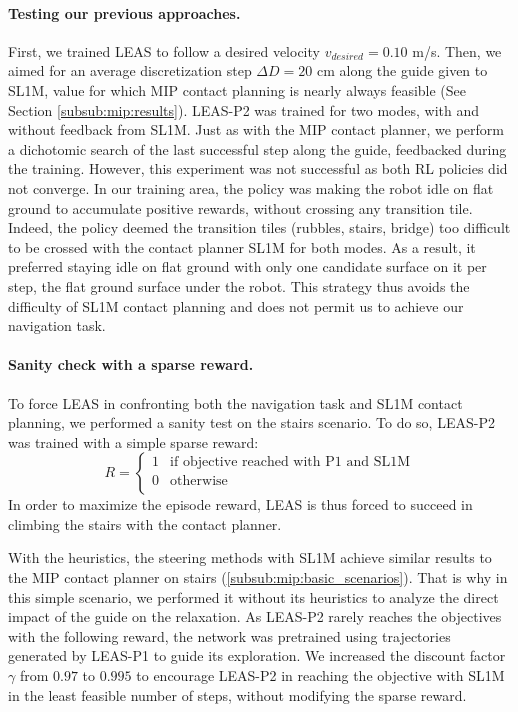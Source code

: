 \paragraph{Testing our previous approaches.}
First, we trained LEAS to follow a desired velocity $v_{desired}=0.10$ m/s. 
Then, we aimed for an average discretization step $\Delta D=20$ cm along the guide given to SL1M, value for which MIP contact planning is nearly always feasible (See Section \ref{subsub:mip:results}).
LEAS-P2 was trained for two modes, with and without feedback from SL1M. Just as with the MIP contact planner, we perform a dichotomic search of the last successful step along the guide, feedbacked during the training.
However, this experiment was not successful as both RL policies did not converge.
In our training area, the policy was making the robot idle on flat ground to accumulate positive rewards, without crossing any transition tile. 
Indeed, the policy deemed the transition tiles (rubbles, stairs, bridge) too difficult to be crossed with the contact planner SL1M for both modes.
As a result, it preferred staying idle on flat ground with only one candidate surface on it per step, the flat ground surface under the robot.
This strategy thus avoids the difficulty of SL1M contact planning and does not permit us to achieve our navigation task.


\paragraph{Sanity check with a sparse reward.}
To force LEAS in confronting both the navigation task and SL1M contact planning, we performed a sanity test on the stairs scenario.
To do so, LEAS-P2 was trained with a simple sparse reward:
\begin{equation}
    R = \left\{
    \begin{array}{ll}
        1 & \mbox{if objective reached with P1 and SL1M}\\
        0 & \mbox{otherwise}\\
    \end{array}
\right.
\end{equation}
In order to maximize the episode reward, LEAS is thus forced to succeed in climbing the stairs with the contact planner.

With the heuristics, the steering methods with SL1M achieve similar results to the MIP contact planner on stairs (\ref{subsub:mip:basic_scenarios}).
That is why in this simple scenario, we performed it without its heuristics to analyze the direct impact of the guide on the relaxation.
As LEAS-P2 rarely reaches the objectives with the following reward, the network was pretrained using trajectories generated by LEAS-P1 to guide its exploration.
We increased the discount factor $\gamma$ from $0.97$ to $0.995$ to encourage LEAS-P2 in reaching the objective with SL1M in the least feasible number of steps, without modifying the sparse reward.

